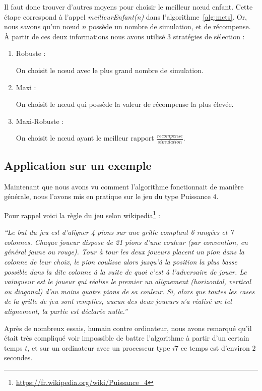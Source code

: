 \documentclass[pdftex,french, english]{article}	%
\begin{document}
Il faut donc trouver d'autres moyens pour choisir le meilleur nœud enfant. 
Cette étape correspond à l'appel \textit{meilleurEnfant(n)} dans l'algorithme~\ref{alg:mcts}. 
Or, nous savons qu'un nœud $n$ possède un nombre de simulation, et de récompense.
	À partir de ces deux informations nous avons utilisé 3 stratégies de sélection :
	\begin{enumerate}
		\item Robuste :
		
		On choisit le nœud avec le plus grand nombre de simulation.
		\item Maxi :  
		
		On choisit le nœud qui possède la valeur de récompense la plus élevée.
		\item Maxi-Robuste :
		
		On choisit le nœud ayant le meilleur rapport $\frac{recompense}{simulation}$.
	\end{enumerate}
    
    
    
    
    
	\subsection{Application sur un exemple}
	Maintenant que nous avons vu comment l'algorithme fonctionnait de manière générale, nous l'avons mis en pratique sur le jeu du type Puissance $4$. 
    

    Pour rappel voici la règle du jeu selon wikipedia\footnote{\url{https://fr.wikipedia.org/wiki/Puissance_4}} :
   
    \begin{displayquote}
    \textit{``Le but du jeu est d'aligner 4 pions sur une grille comptant 6 rangées et 7 colonnes. Chaque joueur dispose de 21 pions d'une couleur (par convention, en général jaune ou rouge). Tour à tour les deux joueurs placent un pion dans la colonne de leur choix, le pion coulisse alors jusqu'à la position la plus basse possible dans la dite colonne à la suite de quoi c'est à l'adversaire de jouer. Le vainqueur est le joueur qui réalise le premier un alignement (horizontal, vertical ou diagonal) d'au moins quatre pions de sa couleur. Si, alors que toutes les cases de la grille de jeu sont remplies, aucun des deux joueurs n'a réalisé un tel alignement, la partie est déclarée nulle.''}
   	\end{displayquote}


	Après de nombreux essais, humain contre ordinateur, nous avons remarqué qu'il était très compliqué voir impossible de battre l'algorithme à partir d'un certain temps $t$, et sur un ordinateur avec un processeur type $i7$ ce temps est d'environ $2$ secondes.
	
\end{document}

